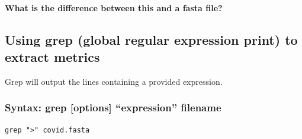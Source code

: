 \documentclass[
]{book}
\begin{document}
\hypertarget{what-is-the-difference-between-this-and-a-fasta-file}{%
\paragraph*{What is the difference between this and a fasta file?}\label{what-is-the-difference-between-this-and-a-fasta-file}}

\hypertarget{using-grep-global-regular-expression-print-to-extract-metrics}{%
\subsection{Using grep (global regular expression print) to extract metrics}\label{using-grep-global-regular-expression-print-to-extract-metrics}}

Grep will output the lines containing a provided expression.

\hypertarget{syntax-grep-options-expression-filename}{%
\subsubsection*{Syntax: grep {[}options{]} ``expression'' filename}\label{syntax-grep-options-expression-filename}}

\begin{verbatim}
grep ">" covid.fasta
\end{verbatim}
\end{document}
